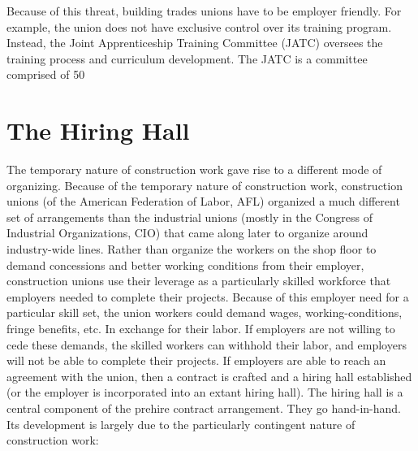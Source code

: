 Because of this threat, building trades unions have to be employer friendly. For example, the union does not have exclusive control over its training program. Instead, the Joint Apprenticeship Training Committee (JATC) oversees the training process and curriculum development. The JATC is a committee comprised of 50%

\section{The Hiring Hall}

The temporary nature of construction work gave rise to a different mode of organizing. Because of the temporary nature of construction work, construction unions (of the American Federation of Labor, AFL) organized a much different set of arrangements than the industrial unions (mostly in the Congress of Industrial Organizations, CIO) that came along later to organize around industry-wide lines. Rather than organize the workers on the shop floor to demand concessions and better working conditions from their employer, construction unions use their leverage as a particularly skilled workforce that employers needed to complete their projects. Because of this employer need for a particular skill set, the union workers could demand wages, working-conditions, fringe benefits, etc. In exchange for their labor. If employers are not willing to cede these demands, the skilled workers can withhold their labor, and employers will not be able to complete their projects. If employers are able to reach an agreement with the union, then a contract is crafted and a hiring hall established (or the employer is incorporated into an extant hiring hall). The hiring hall is a central component of the prehire contract arrangement. They go hand-in-hand. Its development is largely due to the particularly contingent nature of construction work:

